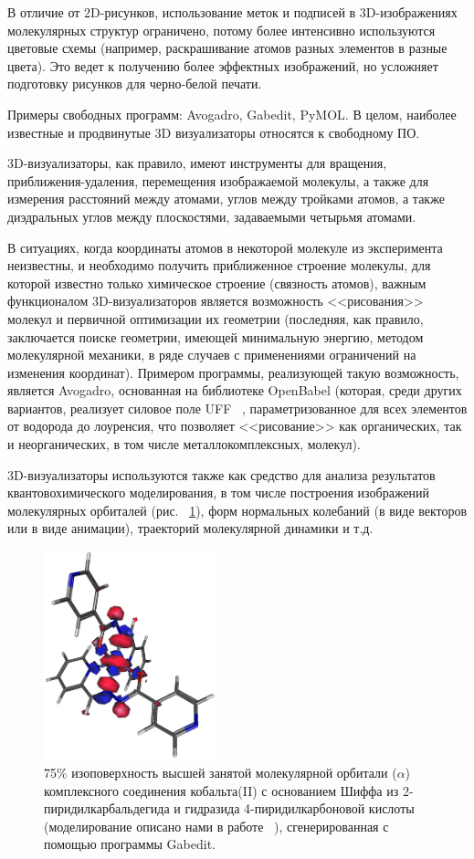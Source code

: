 \documentclass[10pt, a5paper]{article}
\begin{document}
В отличие от 2D-рисунков, использование меток и подписей в 3D-изображениях молекулярных структур ограничено, потому более интенсивно используются цветовые схемы (например, раскрашивание атомов разных элементов в разные цвета). Это ведет к получению более эффектных изображений, но усложняет подготовку рисунков для черно-белой печати.

Примеры свободных программ: Avogadro, Gabedit, PyMOL. В целом, наиболее известные и продвинутые 3D визуализаторы относятся к свободному ПО.

3D-визуализаторы, как правило, имеют инструменты для вращения, приближения-удаления, перемещения изображаемой молекулы, а также для измерения расстояний между атомами, углов между тройками атомов, а также диэдральных углов между плоскостями, задаваемыми четырьмя атомами.

В ситуациях, когда координаты атомов в некоторой молекуле из эксперимента неизвестны, и необходимо получить приближенное строение молекулы, для которой известно только химическое строение (связность атомов), важным функционалом 3D-визуализаторов является возможность <<рисования>> молекул и первичной оптимизации их геометрии (последняя, как правило, заключается поиске геометрии, имеющей минимальную энергию, методом молекулярной механики, в ряде случаев с применениями ограничений на изменения координат). Примером программы, реализующей такую возможность, является Avogadro, основанная на библиотеке OpenBabel (которая, среди других вариантов, реализует силовое поле UFF ~\cite{Litvenenka4}, параметризованное для всех элементов от водорода до лоуренсия, что позволяет <<рисование>> как органических, так и неорганических, в том числе металлокомплексных, молекул).

3D-визуализаторы используются также как средство для анализа результатов квантовохимического моделирования, в том числе построения изображений молекулярных орбиталей (рис. ~\ref{Litvenenka4}), форм нормальных колебаний (в виде векторов или в виде анимации), траекторий молекулярной динамики и т.д.

\begin{figure}[h!]
  \centering
  \includegraphics[width=5cm]{20_2016_Litvenenka4.png}
  \caption{75\% изоповерхность высшей занятой молекулярной орбитали ($\alpha$) комплексного соединения кобальта(II) с основанием Шиффа из 2-пиридилкарбальдегида и гидразида 4-пиридилкарбоновой кислоты (моделирование описано нами в работе ~\cite{Litvenenka3}), сгенерированная с помощью программы Gabedit.}
  \label{Litvenenka4}
\end{figure} 
\end{document}
